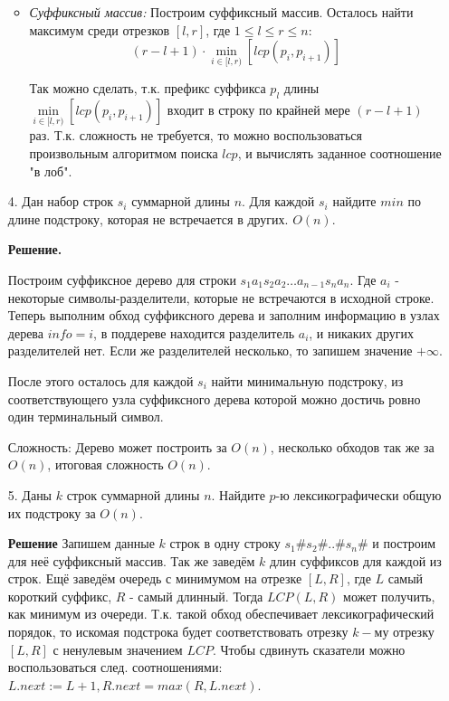 \begin{enumerate}
\begin{itemize}
		\item \textit{Суффиксный массив:} Построим суффиксный массив. Осталось найти максимум среди отрезков $[l, 
		r]$, где $1 \leq l \leq r \leq n$:
		\begin{equation*}
			(r - l + 1) \cdot \min \limits_{i \in [l, r)} \left[ lcp(p_i, p_{i + 1}) \right]
		\end{equation*}
		
		Так можно сделать, т.к. префикс суффикса $p_l$ длины $\min \limits_{i \in [l, r)} \left[ lcp(p_i, p_{i + 
		1}) \right]$ входит в строку по крайней мере $(r - l + 1)$ раз. Т.к. сложность не требуется, то можно 
		воспользоваться произвольным алгоритмом поиска $lcp$, и вычислять заданное соотношение "в лоб".
		
	\end{itemize}
	\item[4.] Дан набор строк $s_i$ суммарной длины $n$. Для каждой $s_i$ найдите $min$ по длине подстроку, которая не встречается в других. $O(n)$.
	
	\textbf{Решение.} 
	
	Построим суффиксное дерево для строки $s_1a_1s_2a_2\dots a_{n - 1}s_na_n$. Где $a_i$ - некоторые 
	символы-разделители, которые не встречаются в исходной строке. Теперь выполним обход суффиксного дерева и 
	заполним информацию в узлах дерева $info = i$, в поддереве находится разделитель $a_i$, и никаких других 
	разделителей нет. Если же разделителей несколько, то запишем значение $+\infty$. 
	
	После этого осталось для каждой $s_i$ найти минимальную подстроку, из соответствующего узла суффиксного 
	дерева которой можно достичь ровно один терминальный символ.
	
	Сложность: Дерево может построить за $O(n)$, несколько обходов так же за $O(n)$, итоговая сложность $O(n)$.
	
	\item[5.] Даны $k$ строк суммарной длины $n$. Найдите $p$-ю лексикографически общую их подстроку за $O(n)$.
	
	\textbf{Решение} Запишем данные $k$ строк в одну строку $s_1\#s_2\#..\#s_n\#$ и построим для неё суффиксный 
	массив. Так же заведём $k$ длин суффиксов для каждой из строк.  Ещё заведём очередь с минимумом на отрезке 
	$[L, R]$, где $L$ самый короткий суффикс, $R$ - самый длинный. Тогда $LCP(L,R)$ может получить, как минимум 
	из очереди. Т.к. такой обход обеспечивает лексикографический порядок, то искомая подстрока будет 
	соответствовать отрезку $k-$му отрезку $[L, R]$ с ненулевым значением $LCP$. Чтобы сдвинуть сказатели можно 
	воспользоваться след. соотношениями: $L.next := L + 1, R.next = max(R, L.next)$.
\end{enumerate}
